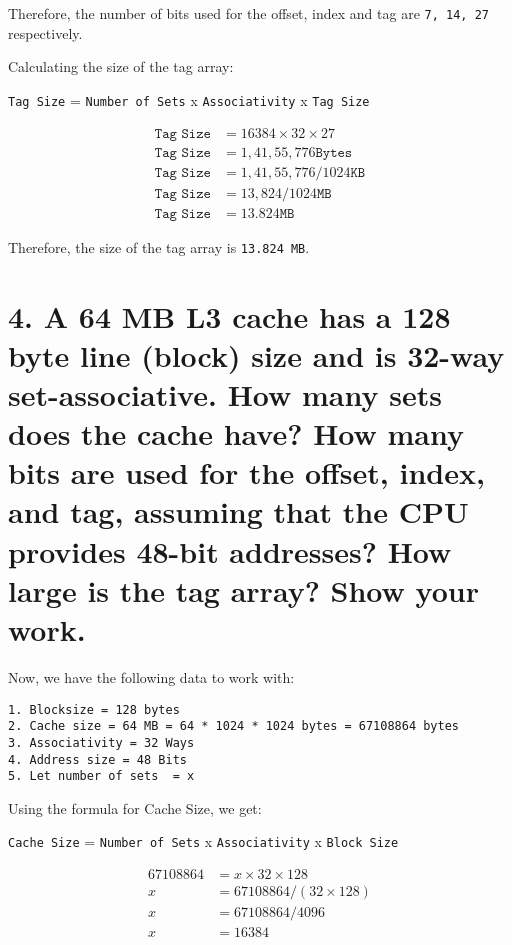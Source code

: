 \documentclass[11pt]{article}
\begin{document}
Therefore, the number of bits used for the offset, index and tag are \texttt{7, 14, 27} respectively.

Calculating the size of the tag array:

\texttt{Tag Size} = \texttt{Number of Sets} x \texttt{Associativity} x \texttt{Tag Size}

\begin{equation}
\begin{split}
\texttt{Tag Size} &= 16384 \times 32 \times 27 \\
\texttt{Tag Size} &= 1,41,55,776  \texttt{Bytes} \\
\texttt{Tag Size} &= 1,41,55,776 / 1024 \texttt{KB} \\
\texttt{Tag Size} &= 13,824 / 1024 \texttt{MB} \\
\texttt{Tag Size} &= 13.824 \texttt{MB}
\end{split}
\end{equation}

Therefore, the size of the tag array is \texttt{13.824 MB}.


\newpage

\section*{4. A 64 MB L3 cache has a 128 byte line (block) size and is 32-way set-associative. How many sets does the cache have? How many bits are used for the offset, index, and tag, assuming that the CPU provides 48-bit addresses? How large is the tag array? Show your work.}

Now, we have the following data to work with:
\begin{verbatim}
1. Blocksize = 128 bytes
2. Cache size = 64 MB = 64 * 1024 * 1024 bytes = 67108864 bytes
3. Associativity = 32 Ways
4. Address size = 48 Bits
5. Let number of sets  = x
\end{verbatim}

Using the formula for Cache Size, we get:

\texttt{Cache Size} = \texttt{Number of Sets} x \texttt{Associativity} x \texttt{Block Size}

\begin{equation}
\begin{split}
67108864 &= x \times 32 \times 128 \\
x &= 67108864 / (32 \times 128) \\
x &= 67108864 / 4096 \\
x &= 16384
\end{split}
\end{equation}
\end{document}
